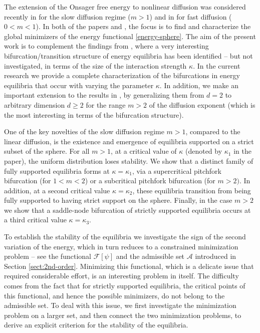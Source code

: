 \documentclass[11pt]{amsart}
\newcommand{\calA}{\mathcal{A}}
\newcommand{\calF}{\mathcal{F}}
\newcommand{\dm}{d} %
\begin{document}
The extension of the Onsager free energy to nonlinear diffusion was considered recently in \cite{FePaVa2025} for the slow diffusion regime ($m>1$) and in \cite{FePa2026-fast} for fast diffusion ($0<m<1$). In both of the papers \cite{FePaVa2025} and \cite{FePa2026-fast}, the focus is to find and characterize the global minimizers of the energy functional \eqref{energy-sphere}. The aim of the present work is to complement the findings from \cite{FePaVa2025}, where a very interesting bifurcation/transition structure of energy equilibria has been identified -- but not investigated, in terms of the size of the interaction strength $\kappa$. In the current research we provide a complete characterization of the bifurcations in energy equilibria that occur with varying the parameter $\kappa$. In addition, we make an important extension to the results in \cite{FePaVa2025}, by generalizing them from $\dm =2$ to arbitrary dimension $\dm\geq 2$ for the range $m>2$ of the diffusion exponent (which is the most interesting in terms of the bifurcation structure).

One of the key novelties of the slow diffusion regime $m>1$, compared to the linear diffusion, is the existence and emergence of equilibria supported on a strict subset of the sphere.  For all $m>1$, at a critical value of $\kappa$ (denoted by $\kappa_1$ in the paper), the uniform distribution loses stability. We show that a distinct family of fully supported equilibria forms at $\kappa=\kappa_1$, via a supercritical pitchfork bifurcation (for $1<m<2$) or a subcritical pitchfork bifurcation (for $m>2)$. In addition, at a second critical value $\kappa=\kappa_2$, these equilibria transition from being fully supported to having strict support on the sphere. Finally, in the case $m>2$ we show that a saddle-node bifurcation of strictly supported equilibria occurs at a third critical value $\kappa=\kappa_3$.

To establish the stability of the equilibria we investigate the sign of the second variation of the energy, which in turn reduces to a constrained minimization problem -- see the functional $\calF[\psi]$ and the admissible set $\calA$ introduced in Section \ref{sect:2nd-order}. Minimizing this functional, which is a delicate issue that required considerable effort, is an interesting problem in itself. The difficulty comes from the fact that for strictly supported equilibria, the critical points of this functional, and hence the possible minimizers, do not belong to the admissible set. To deal with this issue, we first investigate the minimization problem on a larger set, and then connect the two minimization problems, to derive an explicit criterion for the stability of the equilibria.
\end{document}
